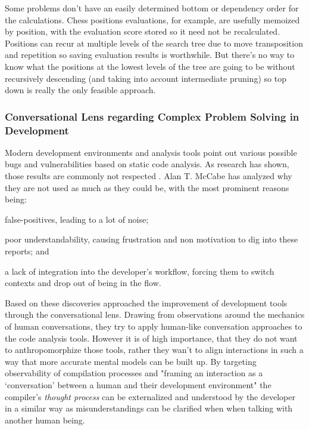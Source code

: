 Some problems don't have an easily determined bottom or dependency order for the calculations. Chess positions evaluations, for example, are usefully memoized by position, with the evaluation score stored so it need not be recalculated. Positions can recur at multiple levels of the search tree due to move transposition and repetition so saving evaluation results is worthwhile. But there's no way to know what the positions at the lowest levels of the tree are going to be without recursively descending (and taking into account intermediate pruning) so top down is really the only feasible approach.




\subsubsection{Conversational Lens regarding Complex Problem Solving in Development}
\label{sec:conversational-lens}
Modern development environments and analysis tools point out various possible bugs and vulnerabilities based on static code analysis.
As research has shown, those results are commonly not respected \cite{mccabe_towards_2023}.
Alan T. McCabe has analyzed why they are not used as much as they could be, with the most prominent reasons being:
\begin{enumerate*}[label=(\roman*)]
\item false-positives, leading to a lot of noise;
\item poor understandability, causing frustration and non motivation to dig into these reports; and
\item a lack of integration into the developer's workflow, forcing them to switch contexts and drop out of being in the flow.
\end{enumerate*}
Based on these discoveries \citeauthor{mccabe_towards_2023} approached the improvement of development tools through the conversational lens.
Drawing from observations around the mechanics of human conversations, they try to apply human-like conversation approaches to the code analysis tools.
However it is of high importance, that they do not want to anthropomorphize those tools, rather they wan't to align interactions in such a way that more accurate mental models can be built up.
By targeting observability of compilation processes and "framing an interaction as a `conversation' between a human and their development environment" \cite{mccabe_towards_2023} the compiler's \emph{thought process} can be externalized and understood by the developer in a similar way as misunderstandings can be clarified when when talking with another human being.

